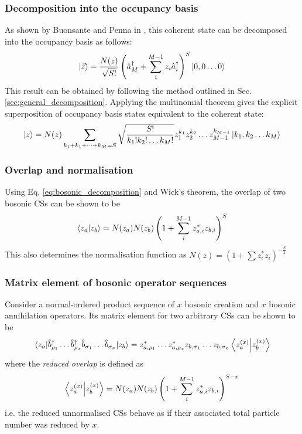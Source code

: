 \subsubsection{Decomposition into the occupancy basis}
As shown by Buonsante and Penna in \cite{buonsante}, this coherent state can be decomposed into the occupancy basis as follows:
\begin{equation} \label{eq:bosonic_decomposition}
\ket{\vec{z}}=\frac{N(z)}{\sqrt{S!}}\left(\hat{a}^\dagger_M+\sum_i^{M-1}z_i\hat{a}^\dagger_i\right)^S\ket{0,0\dots 0}
\end{equation}
This result can be obtained by following the method outlined in Sec. \ref{sec:general_decomposition}. Applying the multinomial theorem gives the explicit superposition of occupancy basis states equivalent to the coherent state:
\begin{equation}
\ket{z}=N(z)\sum_{k_1+k_1+\dots +k_M=S}\sqrt{\frac{S!}{k_1!k_2!\dots k_M!}}z_1^{k_1}z_2^{k_2}\dots z_{M-1}^{k_{M-1}}\ket{k_1,k_2\dots k_M}
\end{equation}

\subsubsection{Overlap and normalisation}
Using Eq. \ref{eq:bosonic_decomposition} and Wick's theorem, the overlap of two bosonic CSs can be shown \cite{grossmann} to be
\begin{equation} \label{eq:bosonic_overlap}
\braket{z_a}{z_b}=N(z_a)N(z_b)\left(1+\sum_i^{M-1}z_{a,i}^*z_{b,i}\right)^S
\end{equation}
This also determines the normalisation function as
$N(z)=\left(1+\sum z_i^*z_i\right)^{-\frac{S}{2}}$


\subsubsection{Matrix element of bosonic operator sequences}
Consider a normal-ordered product sequence of $x$ bosonic creation and $x$ bosonic annihilation operators. Its matrix element for two arbitrary CSs can be shown \cite{grossmann} to be
\begin{equation} \label{eq:bosonic_OSME}
\mel{z_a}{\hat{b}^\dagger_{\rho_1}\dots\hat{b}^\dagger_{\rho_x}\hat{b}_{\sigma_1}\dots\hat{b}_{\sigma_x}}{z_b}=z_{a,\rho_1}^*\dots z_{a,\rho_x}^*z_{b,\sigma_1}\dots z_{b,\sigma_x} \braket{z_a^{(x)}}{z_b^{(x)}}
\end{equation}
where the \textit{reduced overlap} is defined as
\begin{equation}
\braket{z_a^{(x)}}{z_b^{(x)}}=N(z_a)N(z_b)\left(1+\sum_i^{M-1}z_{a,i}^*z_{b,i}\right)^{S-x}
\end{equation}
i.e. the reduced unnormalised CSs behave as if their associated total particle number was reduced by $x$.

